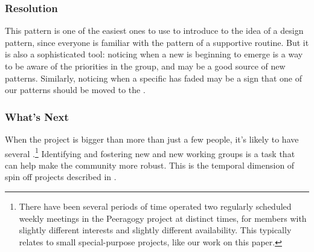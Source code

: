 \subsubsection*{Resolution} This pattern is one of the easiest ones to use to introduce  to the idea of a design pattern, since everyone is familiar with the pattern of a supportive routine.  But it is also a sophisticated tool: noticing when a new  is beginning to emerge is a way to be aware of the priorities in the group, and may be a good source of new patterns.  Similarly, noticing when a specific  has faded may be a sign that one of our patterns should be moved to the .

\subsubsection*{What's Next} When the project is bigger than more than just a few people, it's likely to have several .\footnote{There have been several periods of time operated two regularly scheduled weekly meetings in the Peeragogy project at distinct times, for members with slightly different interests and slightly different availability.  This typically relates to small special-purpose projects, like our work on this paper.}  Identifying and fostering new  and new working groups is a task that can help make the community more robust.  This is the temporal dimension of spin off projects described in .

